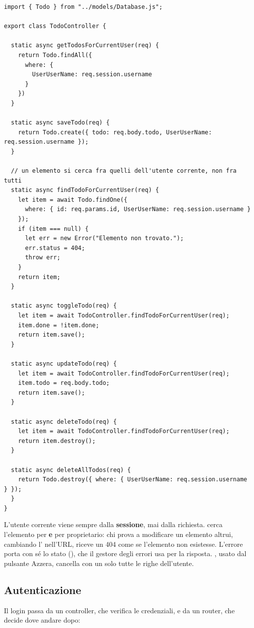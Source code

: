 \begin{lstlisting}[style=js, name=controllers/TodoController.js]
import { Todo } from "../models/Database.js";

export class TodoController {

  static async getTodosForCurrentUser(req) {
    return Todo.findAll({
      where: {
        UserUserName: req.session.username
      }
    })
  }

  static async saveTodo(req) {
    return Todo.create({ todo: req.body.todo, UserUserName: req.session.username });
  }

  // un elemento si cerca fra quelli dell'utente corrente, non fra tutti
  static async findTodoForCurrentUser(req) {
    let item = await Todo.findOne({
      where: { id: req.params.id, UserUserName: req.session.username }
    });
    if (item === null) {
      let err = new Error("Elemento non trovato.");
      err.status = 404;
      throw err;
    }
    return item;
  }

  static async toggleTodo(req) {
    let item = await TodoController.findTodoForCurrentUser(req);
    item.done = !item.done;
    return item.save();
  }

  static async updateTodo(req) {
    let item = await TodoController.findTodoForCurrentUser(req);
    item.todo = req.body.todo;
    return item.save();
  }

  static async deleteTodo(req) {
    let item = await TodoController.findTodoForCurrentUser(req);
    return item.destroy();
  }

  static async deleteAllTodos(req) {
    return Todo.destroy({ where: { UserUserName: req.session.username } });
  }
}
\end{lstlisting}

L'utente corrente viene sempre dalla \textbf{sessione}, mai dalla richiesta.
 cerca l'elemento per  \textbf{e} per
proprietario: chi prova a modificare un elemento altrui, cambiando l'
nell'URL, riceve un 404 come se l'elemento non esistesse. L'errore porta con sé
lo stato (), che il gestore degli errori usa per la risposta.
, usato dal pulsante Azzera, cancella con un solo
 tutte le righe dell'utente.

\subsection{Autenticazione}

Il login passa da un controller, che verifica le credenziali, e da un router,
che decide dove andare dopo:

